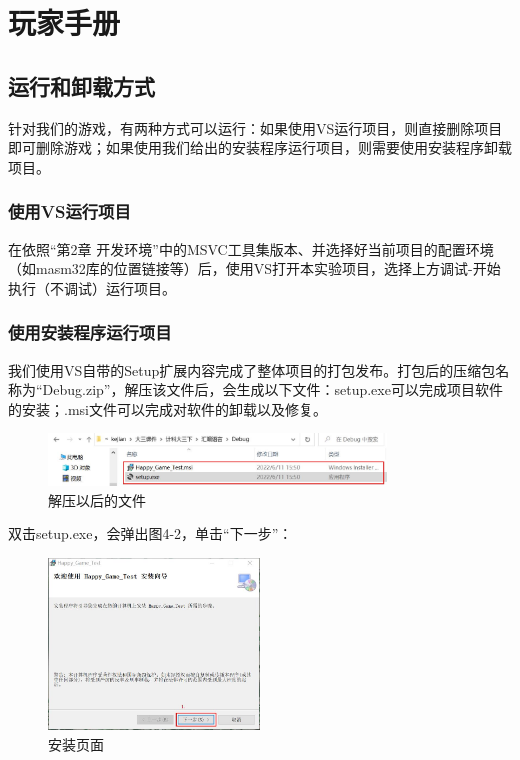 \chapter{玩家手册}
\section{运行和卸载方式}
针对我们的游戏，有两种方式可以运行：如果使用VS运行项目，则直接删除项目即可删除游戏；如果使用我们给出的安装程序运行项目，则需要使用安装程序卸载项目。
\subsection{使用VS运行项目}
在依照“第2章 开发环境”中的MSVC工具集版本、并选择好当前项目的配置环境（如masm32库的位置链接等）后，使用VS打开本实验项目，选择上方调试-开始执行（不调试）运行项目。
\subsection{使用安装程序运行项目}
我们使用VS自带的Setup扩展内容完成了整体项目的打包发布。打包后的压缩包名称为“Debug.zip”，解压该文件后，会生成以下文件：setup.exe可以完成项目软件的安装；.msi文件可以完成对软件的卸载以及修复。
\begin{figure}[htbp]
    \vspace{13pt} %
    \centering
    \includegraphics[width=0.8\textwidth]{images/4-1.jpg}
    \caption{解压以后的文件}%
\end{figure}
\par
双击setup.exe，会弹出图4-2，单击“下一步”：
\par
\begin{figure}[htbp]
    \vspace{13pt} %
    \centering
    \includegraphics[width=0.5\textwidth]{images/4-2.jpg}
    \caption{安装页面}%
\end{figure}
